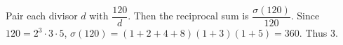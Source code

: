 Pair each divisor $ d $ with $\dfrac{120}{d}$. Then the reciprocal sum is $\dfrac{\sigma(120)}{120}$. Since $ 120=2^3\cdot3\cdot5 $, $\sigma(120)=(1+2+4+8)(1+3)(1+5)=360 $. Thus $\boxed3 $.
